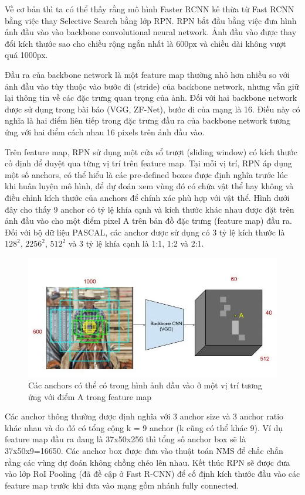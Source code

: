 Về cơ bản thì ta có thể thấy rằng mô hình Faster RCNN kế thừa từ Fast RCNN bằng việc thay Selective Search bằng lớp RPN. 
RPN bắt đầu bằng việc đưa hình ảnh đầu vào vào backbone convolutional neural network. Ảnh đầu vào được thay đổi kích thước sao cho chiều rộng ngắn nhất là 600px và chiều dài không vượt quá 1000px.

Đầu ra của backbone network là một feature map thường nhỏ hơn nhiều so với ảnh đầu vào tùy thuộc vào bước đi (stride) của backbone network, nhưng vẫn giữ lại thông tin về các đặc trưng quan trọng của ảnh. Đối với hai backbone network được sử dụng trong bài báo (VGG, ZF-Net), bước đi của mạng là 16. Điều này có nghĩa là hai điểm liên tiếp trong đặc trưng đầu ra của backbone network tương ứng với hai điểm cách nhau 16 pixels trên ảnh đầu vào.

Trên feature map, RPN sử dụng một cửa sổ trượt (sliding window) có kích thước cố định để duyệt qua từng vị trí trên feature map. Tại mỗi vị trí, RPN áp dụng một số anchors, có thể hiểu là các pre-defined boxes được định nghĩa trước lúc khi huấn luyện mô hình, để dự đoán xem vùng đó có chứa vật thể hay không và điều chỉnh kích thước của anchors để chính xác phù hợp với vật thể. Hình dưới đây cho thấy 9 anchor có tỷ lệ khía cạnh và kích thước khác nhau được đặt trên ảnh đầu vào cho một điểm pixel A trên bản đồ đặc trưng (feature map) đầu ra. Đối với bộ dữ liệu PASCAL, các anchor được sử dụng có 3 tỷ lệ kích thước là \(128^2\), \(2256^2\), \(512^2\) và 3 tỷ lệ khía cạnh là 1:1, 1:2 và 2:1.
\graphicspath{{figures/}}
\begin{figure}[h!]
  \centering
  \includegraphics[scale=0.45]{graphics/anchor.png}
  \caption{Các anchors có thể có trong hình ảnh đầu vào ở một vị trí tương ứng với điểm A trong feature map}
\end{figure}

Các anchor thông thường được định nghĩa với 3 anchor size và 3 anchor ratio khác nhau và do đó có tổng cộng k = 9 anchor (k cũng có thể khác 9). Ví dụ feature map đầu ra đang là 37x50x256 thì tổng số anchor box sẽ là 37x50x9=16650. Các anchor box được đưa vào thuật toán NMS để chắc chắn rằng các vùng dự đoán không chồng chéo lên nhau. Kết thúc RPN sẽ được đưa vào lớp RoI Pooling (đã đề cập ở Fast R-CNN) để cố định kích thước đầu vào các feature map trước khi đưa vào mạng gồm nhánh fully connected.

